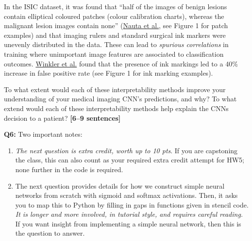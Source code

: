 In the ISIC dataset, it was found that ``half of the images of benign lesions contain elliptical coloured patches (colour calibration charts), whereas the malignant lesion images contain none'' (\href{https://www.mdpi.com/2075-4418/12/1/40}{Nauta et al.}, see Figure 1 for patch examples) and that imaging rulers and standard surgical ink markers were unevenly distributed in the data. These can lead to \emph{spurious correlations} in training where unimportant image features are associated to classification outcomes. \href{https://www.ncbi.nlm.nih.gov/pmc/articles/PMC6694463/}{Winkler et al.} found that the presence of ink markings led to a 40\% increase in false positive rate (see Figure 1 for ink marking examples).


\begin{tcolorbox}[colback=orange!5!white,colframe=orange!75!black]
To what extent would each of these interpretability methods improve your understanding of your medical imaging CNN's predictions, and why?
To what extend would each of these interpretability methods help explain the CNNs decision to a patient?
\textbf{[6--9 sentences]}
\end{tcolorbox}



\pagebreak
\textbf{Q6:} Two important notes:

\begin{enumerate}
\item \emph{The next question is extra credit, worth up to 10 pts}. If you are capstoning the class, this can also count as your required extra credit attempt for HW5; none further in the code is required.

\item The next question provides details for how we construct simple neural networks from scratch with sigmoid and softmax activations. Then, it asks you to map this to Python by filling in gaps in functions given in stencil code. \emph{It is longer and more involved, in tutorial style, and requires careful reading.} If you want insight from implementing a simple neural network, then this is the question to answer.
\end{enumerate}

